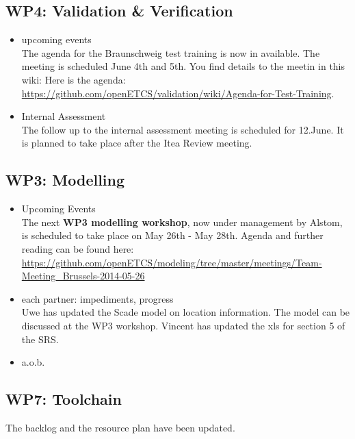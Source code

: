 \documentclass[a4paper, 11pt]{article}
\begin{document}
\subsection{WP4: Validation \& Verification}
\begin{itemize}
\item upcoming events\\
The agenda for the Braunschweig test training is now in available. The meeting is scheduled June 4th and 5th. You find details to the meetin in this wiki: Here is the agenda: \url{https://github.com/openETCS/validation/wiki/Agenda-for-Test-Training}.

\item Internal Assessment\\
The follow up to the internal assessment meeting is scheduled for 12.June. It is planned to take place after the Itea Review meeting.

\end{itemize}

\subsection{WP3: Modelling}

\begin{itemize}
\item Upcoming Events\\
The next \textbf{WP3 modelling workshop}, now under management by Alstom, is  scheduled to take place on May 26th - May 28th. Agenda and further reading can be found here: \url{https://github.com/openETCS/modeling/tree/master/meetings/Team-Meeting_Brussels-2014-05-26}

\item each partner: impediments, progress\\
Uwe has updated the Scade model on location information. The model can be discussed at the WP3 workshop. Vincent has updated the xls for section 5 of the SRS.

\item a.o.b.\\

\end{itemize}

\subsection{WP7: Toolchain}

The backlog and the resource plan have been updated.
\end{document}
